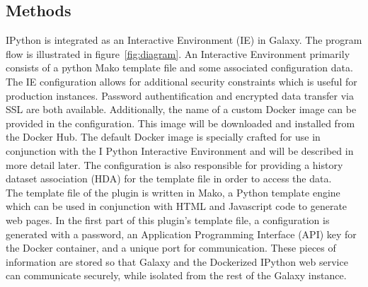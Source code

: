 \documentclass{bioinfo}
\begin{document}
\begin{methods}
\section{Methods}

IPython is integrated as an Interactive Environment (IE) in Galaxy. The program flow is illustrated in 
figure~\ref{fig:diagram}. An Interactive Environment primarily consists of a python Mako template file and some
associated configuration data. The IE configuration allows for additional security constraints which is useful
for production instances. Password authentification and encrypted data transfer via SSL are both available.
Additionally, the name of a custom Docker image can be provided in the configuration. This image will be downloaded and 
installed from the Docker Hub. The default Docker image is specially crafted for use in conjunction with the I
Python Interactive Environment and will be described in more detail later. The configuration is also responsible for providing a history dataset 
association (HDA) for the template file in order to access the data. \\
The template file of the plugin is written in Mako, a Python template engine which can be used in conjunction with HTML
and Javascript code to generate web pages. In the first part of this plugin's template file, a configuration is generated with a password, 
an Application Programming Interface (API) key for the Docker container, and a unique port for communication. These pieces of information are stored so that Galaxy
and the Dockerized IPython web service can communicate securely, while isolated from the rest of the Galaxy instance.


\end{methods}
\end{document}
